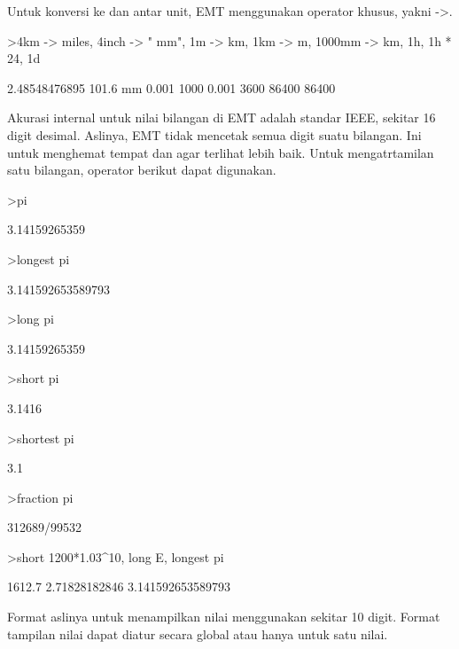 \documentclass[a4paper,10pt]{article}
\begin{document}
\begin{eulernotebook}
\begin{eulercomment}
Untuk konversi ke dan antar unit, EMT menggunakan operator khusus,
yakni -\textgreater{}.
\end{eulercomment}
\begin{eulerprompt}
>4km -> miles, 4inch -> " mm", 1m -> km, 1km -> m, 1000mm -> km, 1h, 1h * 24, 1d
\end{eulerprompt}
\begin{euleroutput}
  2.48548476895
  101.6 mm
  0.001
  1000
  0.001
  3600
  86400
  86400
\end{euleroutput}
\begin{eulercomment}
Akurasi internal untuk nilai bilangan di EMT adalah standar IEEE,
sekitar 16 digit desimal. Aslinya, EMT tidak mencetak semua digit
suatu bilangan. Ini untuk menghemat tempat dan agar terlihat lebih
baik. Untuk mengatrtamilan satu bilangan, operator berikut dapat
digunakan.

\end{eulercomment}
\begin{eulerprompt}
>pi
\end{eulerprompt}
\begin{euleroutput}
  3.14159265359
\end{euleroutput}
\begin{eulerprompt}
>longest pi
\end{eulerprompt}
\begin{euleroutput}
        3.141592653589793 
\end{euleroutput}
\begin{eulerprompt}
>long pi
\end{eulerprompt}
\begin{euleroutput}
  3.14159265359
\end{euleroutput}
\begin{eulerprompt}
>short pi
\end{eulerprompt}
\begin{euleroutput}
  3.1416
\end{euleroutput}
\begin{eulerprompt}
>shortest pi
\end{eulerprompt}
\begin{euleroutput}
     3.1 
\end{euleroutput}
\begin{eulerprompt}
>fraction pi
\end{eulerprompt}
\begin{euleroutput}
  312689/99532
\end{euleroutput}
\begin{eulerprompt}
>short 1200*1.03^10, long E, longest pi
\end{eulerprompt}
\begin{euleroutput}
  1612.7
  2.71828182846
        3.141592653589793 
\end{euleroutput}
\begin{eulercomment}
Format aslinya untuk menampilkan nilai menggunakan sekitar 10 digit.
Format tampilan nilai dapat diatur secara global atau hanya untuk satu
nilai.


\end{eulercomment}
\end{eulernotebook}
\end{document}
